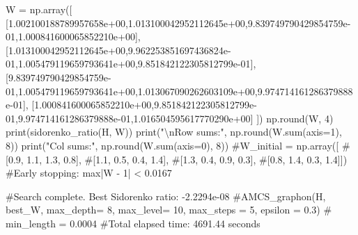 \documentclass[
  letterpaper,
  DIV=11,
  numbers=noendperiod]{scrartcl}
\newenvironment{Shaded}{\begin{snugshade}}{\end{snugshade}}
\newcommand{\BuiltInTok}[1]{\textcolor[rgb]{0.00,0.23,0.31}{#1}}
\newcommand{\CharTok}[1]{\textcolor[rgb]{0.13,0.47,0.30}{#1}}
\newcommand{\CommentTok}[1]{\textcolor[rgb]{0.37,0.37,0.37}{#1}}
\newcommand{\DecValTok}[1]{\textcolor[rgb]{0.68,0.00,0.00}{#1}}
\newcommand{\FloatTok}[1]{\textcolor[rgb]{0.68,0.00,0.00}{#1}}
\newcommand{\NormalTok}[1]{\textcolor[rgb]{0.00,0.23,0.31}{#1}}
\newcommand{\OperatorTok}[1]{\textcolor[rgb]{0.37,0.37,0.37}{#1}}
\newcommand{\StringTok}[1]{\textcolor[rgb]{0.13,0.47,0.30}{#1}}
\begin{document}
\begin{Shaded}
\begin{Highlighting}[]
\NormalTok{W }\OperatorTok{=}\NormalTok{ np.array([}
\NormalTok{  [}\FloatTok{1.002100188789957658e+00}\NormalTok{,}\FloatTok{1.013100042952112645e+00}\NormalTok{,}\FloatTok{9.839749790429854759e{-}01}\NormalTok{,}\FloatTok{1.000841600065852210e+00}\NormalTok{],}
\NormalTok{[}\FloatTok{1.013100042952112645e+00}\NormalTok{,}\FloatTok{9.962253851697436824e{-}01}\NormalTok{,}\FloatTok{1.005479119659793641e+00}\NormalTok{,}\FloatTok{9.851842122305812799e{-}01}\NormalTok{],}
\NormalTok{[}\FloatTok{9.839749790429854759e{-}01}\NormalTok{,}\FloatTok{1.005479119659793641e+00}\NormalTok{,}\FloatTok{1.013067090262603109e+00}\NormalTok{,}\FloatTok{9.974714161286379888e{-}01}\NormalTok{],}
\NormalTok{[}\FloatTok{1.000841600065852210e+00}\NormalTok{,}\FloatTok{9.851842122305812799e{-}01}\NormalTok{,}\FloatTok{9.974714161286379888e{-}01}\NormalTok{,}\FloatTok{1.016504595617770290e+00}\NormalTok{]}
\NormalTok{])}
\NormalTok{np.}\BuiltInTok{round}\NormalTok{(W, }\DecValTok{4}\NormalTok{)}
\BuiltInTok{print}\NormalTok{(sidorenko\_ratio(H, W))}
\BuiltInTok{print}\NormalTok{(}\StringTok{"}\CharTok{\textbackslash{}n}\StringTok{Row sums:"}\NormalTok{, np.}\BuiltInTok{round}\NormalTok{(W.}\BuiltInTok{sum}\NormalTok{(axis}\OperatorTok{=}\DecValTok{1}\NormalTok{), }\DecValTok{8}\NormalTok{))}
\BuiltInTok{print}\NormalTok{(}\StringTok{"Col sums:"}\NormalTok{, np.}\BuiltInTok{round}\NormalTok{(W.}\BuiltInTok{sum}\NormalTok{(axis}\OperatorTok{=}\DecValTok{0}\NormalTok{), }\DecValTok{8}\NormalTok{))}
\CommentTok{\#W\_initial = np.array([}
    \CommentTok{\#[0.9, 1.1, 1.3, 0.8],}
    \CommentTok{\#[1.1, 0.5, 0.4, 1.4],}
    \CommentTok{\#[1.3, 0.4, 0.9, 0.3],}
    \CommentTok{\#[0.8, 1.4, 0.3, 1.4]])}
\CommentTok{\#Early stopping: max|W {-} 1| \textless{} 0.0167}

\CommentTok{\#Search complete. Best Sidorenko ratio: {-}2.2294e{-}08}
\CommentTok{\#AMCS\_graphon(H, best\_W, max\_depth= 8, max\_level= 10, max\_steps = 5, epsilon = 0.3)}
\CommentTok{\# min\_length = 0.0004}
\CommentTok{\#Total elapsed time: 4691.44 seconds}


\end{Highlighting}
\end{Shaded}
\end{document}

